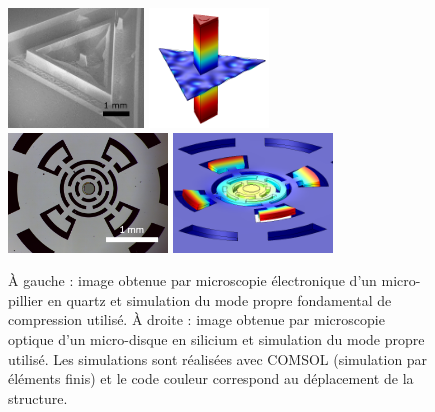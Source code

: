 \documentclass[12pt,a4paper]{article}
\begin{document}
\begin{figure}
\center
\includegraphics[height=90pt]{figures/micropillar.png}
\includegraphics[height=90pt]{figures/micropillar_disp.png}
\includegraphics[height=90pt]{figures/microwheel.png}
\includegraphics[height=90pt]{figures/microwheel_disp.png}
\caption{À gauche : image obtenue par microscopie électronique d'un micro-pillier en quartz et simulation du mode propre fondamental de compression utilisé.
À droite : image obtenue par microscopie optique d'un micro-disque en silicium et simulation du mode propre utilisé.
Les simulations sont réalisées avec COMSOL (simulation par éléments finis) et le code couleur correspond au déplacement de la structure.}
\label{fig:resonators}
\end{figure}
\end{document}
